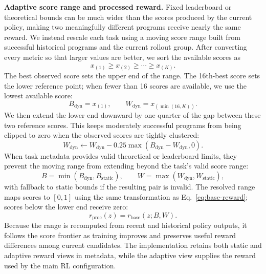 \textbf{Adaptive score range and processed reward.}
Fixed leaderboard or theoretical bounds can be much wider than the scores produced by the current policy, making two meaningfully different programs receive nearly the same reward. We instead rescale each task using a moving score range built from successful historical programs and the current rollout group. After converting every metric so that larger values are better, we sort the available scores as
\[
x_{(1)} \ge x_{(2)} \ge \cdots \ge x_{(K)} .
\]
The best observed score sets the upper end of the range. The 16th-best score sets the lower reference point; when fewer than 16 scores are available, we use the lowest available score:
\[
B_{\mathrm{dyn}} = x_{(1)},\qquad
W_{\mathrm{dyn}} = x_{(\min(16,K))}.
\]
We then extend the lower end downward by one quarter of the gap between these two reference scores. This keeps moderately successful programs from being clipped to zero when the observed scores are tightly clustered:
\[
W_{\mathrm{dyn}} \leftarrow W_{\mathrm{dyn}} - 0.25 \max(B_{\mathrm{dyn}}-W_{\mathrm{dyn}},0).
\]
When task metadata provides valid theoretical or leaderboard limits, they prevent the moving range from extending beyond the task's valid score range:
\[
B=\min(B_{\mathrm{dyn}},B_{\mathrm{static}}),\qquad
W=\max(W_{\mathrm{dyn}},W_{\mathrm{static}}),
\]
with fallback to static bounds if the resulting pair is invalid.
The resolved range maps scores to $[0,1]$ using the same transformation as Eq.~\ref{eq:base-reward}; scores below the lower end receive zero:
\[
r_{\mathrm{proc}}(z)=r_{\mathrm{base}}(z;B,W).
\]
Because the range is recomputed from recent and historical policy outputs, it follows the score frontier as training improves and preserves useful reward differences among current candidates. The implementation retains both static and adaptive reward views in metadata, while the adaptive view supplies the reward used by the main RL configuration.


